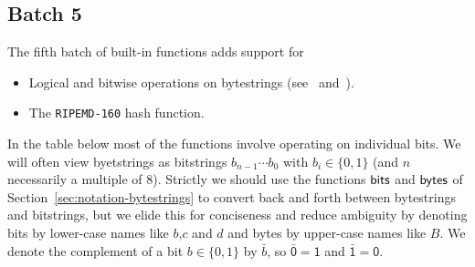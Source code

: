 \renewcommand{\note}[1]{
  \bigskip
  \refstepcounter{notenumberE}
  \noindent\textbf{Note \thenotenumberE. #1}
}

\newcommand\Xand{\mathsf{and}}
\newcommand\Xor{\mathsf{or}}
\newcommand\Xxor{\mathsf{xor}}
\newcommand{\extzero}[1]{\mathtt{0}^*{\cdot}#1}
\newcommand{\extone}[1]{\mathtt{1}^*{\cdot}#1}

\subsection{Batch 5}
\label{sec:default-builtins-5}
The fifth batch of built-in functions adds support for
\begin{itemize}
\item Logical and bitwise operations on bytestrings (see~\cite{CIP-0122} and~\cite{CIP-0123}).
\item The \texttt{RIPEMD-160} hash function.
\end{itemize}

\noindent In the table below most of the functions involve operating on individual bits.
We will often view byetstrings as bitstrings $b_{n-1}\cdots b_0$ with
$b_i \in \{0,1\}$ (and $n$ necessarily a multiple of 8).  Strictly we should use
the functions $\mathsf{bits}$ and $\mathsf{bytes}$ of Section~\ref{sec:notation-bytestrings}
to convert back and forth between bytestrings and bitstrings, but we elide this
for conciseness and reduce ambiguity by denoting bits by lower-case names like
$b$,$c$ and $d$ and bytes by upper-case names like $B$. We denote the
complement of a bit $b \in \{0,1\}$ by $\bar{b}$, so $\bar{\textsf{0}}
= \textsf{1}$ and $\bar{\textsf{1}} = \textsf{0}$.


